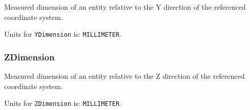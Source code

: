 Measured dimension of an entity relative to the Y direction of the referenced coordinate system.


Units for \texttt{YDimension} is: \texttt{MILLIMETER}.

\FloatBarrier

\subsubsection{ZDimension}
\label{sec:ZDimension}



Measured dimension of an entity relative to the Z direction of the referenced coordinate system.


Units for \texttt{ZDimension} is: \texttt{MILLIMETER}.

\FloatBarrier
